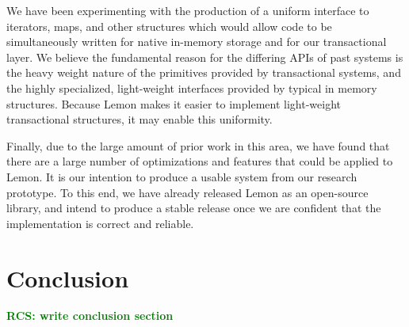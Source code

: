 \documentclass[10pt,letterpaper,twocolumn,english]{article}
\newcommand{\yad}{Lemon\xspace}
\newcommand{\rcs}[1]{\textcolor{green}{\bf RCS: #1}}
\begin{document}

We have been experimenting with the production of a
uniform interface to iterators, maps, and other structures which would
allow code to be simultaneously written for native in-memory storage
and for our transactional layer.  We believe the fundamental reason
for the differing APIs of past systems is the heavy weight nature of
the primitives provided by transactional systems, and the highly
specialized, light-weight interfaces provided by typical in memory
structures.  Because \yad makes it easier to implement light-weight
transactional structures, it may enable this uniformity.

Finally, due to the large amount of prior work in this area, we have
found that there are a large number of optimizations and features that
could be applied to \yad.  It is our intention to produce a usable
system from our research prototype.  To this end, we have already
released \yad as an open-source library, and intend to produce a
stable release once we are confident that the implementation is correct
and reliable.  


\section{Conclusion}

\rcs{write conclusion section}
\end{document}
